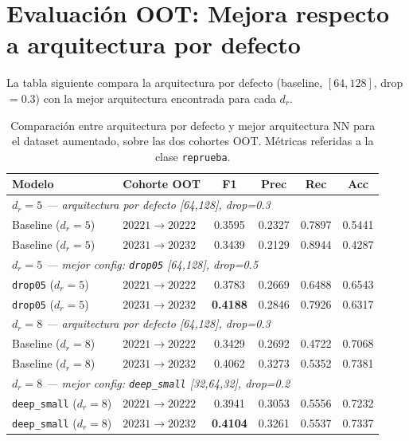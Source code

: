 \documentclass[11pt,a4paper]{article}
\begin{document}
\section{Evaluación OOT: Mejora respecto a arquitectura por defecto}

La tabla siguiente compara la arquitectura por defecto (baseline, $[64,128]$, drop$=0.3$)
con la mejor arquitectura encontrada para cada $d_r$.

\begin{table}[H]
\centering
\caption{Comparación entre arquitectura por defecto y mejor arquitectura NN
para el dataset aumentado, sobre las dos cohortes OOT.
Métricas referidas a la clase \texttt{reprueba}.}
\label{tab:baseline_vs_best}
\begin{tabular}{llcccc}
\toprule
\textbf{Modelo} & \textbf{Cohorte OOT} & \textbf{F1} & \textbf{Prec} & \textbf{Rec} & \textbf{Acc} \\
\midrule
\multicolumn{6}{l}{\textit{$d_r=5$ — arquitectura por defecto [64,128], drop=0.3}} \\
Baseline ($d_r=5$) & $20221 \to 20222$ & 0.3595 & 0.2327 & 0.7897 & 0.5441 \\
Baseline ($d_r=5$) & $20231 \to 20232$ & 0.3439 & 0.2129 & 0.8944 & 0.4287 \\
\midrule
\multicolumn{6}{l}{\textit{$d_r=5$ — mejor config: \texttt{drop05} [64,128], drop=0.5}} \\
\texttt{drop05} ($d_r=5$) & $20221 \to 20222$ & 0.3783 & 0.2669 & 0.6488 & 0.6543 \\
\texttt{drop05} ($d_r=5$) & $20231 \to 20232$ & \textbf{0.4188} & 0.2846 & 0.7926 & 0.6317 \\
\midrule
\multicolumn{6}{l}{\textit{$d_r=8$ — arquitectura por defecto [64,128], drop=0.3}} \\
Baseline ($d_r=8$) & $20221 \to 20222$ & 0.3429 & 0.2692 & 0.4722 & 0.7068 \\
Baseline ($d_r=8$) & $20231 \to 20232$ & 0.4062 & 0.3273 & 0.5352 & 0.7381 \\
\midrule
\multicolumn{6}{l}{\textit{$d_r=8$ — mejor config: \texttt{deep\_small} [32,64,32], drop=0.2}} \\
\texttt{deep\_small} ($d_r=8$) & $20221 \to 20222$ & 0.3941 & 0.3053 & 0.5556 & 0.7232 \\
\texttt{deep\_small} ($d_r=8$) & $20231 \to 20232$ & \textbf{0.4104} & 0.3261 & 0.5537 & 0.7337 \\
\bottomrule
\end{tabular}
\end{table}
\end{document}
